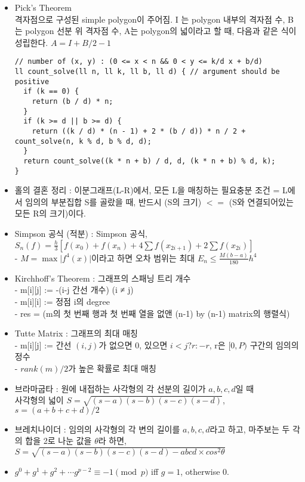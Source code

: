 \documentclass[landscape, 8pt, a4paper, oneside, twocolumn]{extarticle}
\begin{document}
\begin{itemize}
\item Pick’s Theorem\\
격자점으로 구성된 simple polygon이 주어짐. I 는 polygon 내부의 격자점 수, B 는 polygon 선분 위 격자점 수, A는 polygon의 넓이라고 할 때, 다음과 같은 식이 성립한다. $A=I+B/2-1$
\begin{verbatim}
// number of (x, y) : (0 <= x < n && 0 < y <= k/d x + b/d)
ll count_solve(ll n, ll k, ll b, ll d) { // argument should be positive
  if (k == 0) {
    return (b / d) * n;
  }
  if (k >= d || b >= d) {
    return ((k / d) * (n - 1) + 2 * (b / d)) * n / 2 + count_solve(n, k % d, b % d, d);
  }
  return count_solve((k * n + b) / d, d, (k * n + b) % d, k);
}
\end{verbatim}

\item 홀의 결혼 정리 : 이분그래프(L-R)에서, 모든 L을 매칭하는 필요충분 조건 = L에서 임의의 부분집합 S를 골랐을 때, 반드시 (S의 크기) $<=$ (S와 연결되어있는 모든 R의 크기)이다.

\item Simpson 공식 (적분) : Simpson 공식, $S_n(f) = \frac{h}{3}[f(x_0)+f(x_n)+ 4\sum f(x_{2i+1}) + 2\sum f(x_{2i})]$\\
- $M = \max \vert f^4(x) \vert$이라고 하면 오차 범위는 최대 $E_n \leq \frac{M(b-a)}{180}h^4$

\item Kirchhoff’s Theorem : 그래프의 스패닝 트리 개수\\
- m[i][j] :=  -(i-j 간선 개수) (i ≠ j)\\
- m[i][i] :=  정점 i의 degree\\
- res =  (m의 첫 번째 행과 첫 번째 열을 없앤 (n-1) by (n-1) matrix의 행렬식)

\item Tutte Matrix : 그래프의 최대 매칭\\
- m[i][j] := 간선 $(i, j)$가 없으면 0, 있으면 $i < j ? r : -r$, r은 $[0,P)$ 구간의 임의의 정수\\
- $rank(m) / 2$가 높은 확률로 최대 매칭

\item 브라마굽타 : 원에 내접하는 사각형의 각 선분의 길이가 $a, b, c, d$일 때\\
사각형의 넓이 $S=\sqrt{(s-a)(s-b)(s-c)(s-d)}$, $s=(a+b+c+d)/2$

\item 브레치나이더 : 임의의 사각형의 각 변의 길이를 $a,b,c,d$라고 하고, 마주보는 두 각의 합을 2로 나눈 값을 $\theta$라 하면, $S=\sqrt{(s-a)(s-b)(s-c)(s-d)-abcd\times cos^2 \theta}$

\item $g^0+g^1+g^2+\cdots g^{p-2}\equiv -1 \pmod p$ iff $g=1$, otherwise $0$.

\end{itemize}
\end{document}
